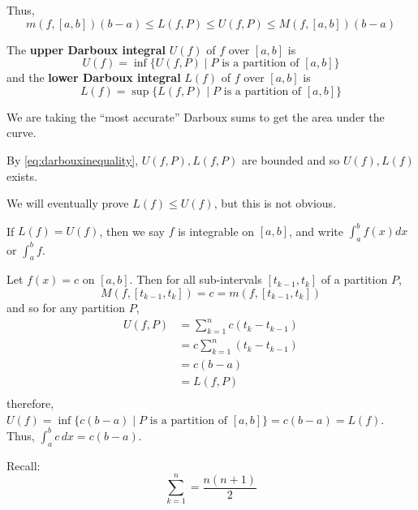 \documentclass{article}
\begin{document}
\begin{proposition}
  Thus,
  \begin{equation} \label{eq:darbouxinequality}
    m(f, [a, b])(b-a) \leq L(f, P) \leq U(f, P) \leq M(f, [a, b])(b-a)
  \end{equation}
\end{proposition}
\begin{definition}
  The \textbf{upper Darboux integral} $U(f)$ of $f$ over $[a, b]$ is \[
    U(f) = \inf \{U(f, P) \mid P \text{ is a partition of } [a, b]\}
  \]
  and the \textbf{lower Darboux integral} $L(f)$ of $f$ over $[a, b]$ is \[
    L(f) = \sup \{L(f, P) \mid P \text{ is a partition of } [a, b]\}
  \]

  We are taking the ``most accurate'' Darboux sums to get the area under the curve.
\end{definition}
\begin{lemma}
  By \eqref{eq:darbouxinequality}, $U(f, P), L(f, P)$ are bounded and so $U(f), L(f)$ exists.
\end{lemma}
\begin{remark}
  We will eventually prove $L(f) \leq U(f)$, but this is not obvious.
\end{remark}
\begin{definition}
  If $L(f) = U(f)$, then we say $f$ is integrable on $[a, b]$, and write $\int_a^b f(x) dx$ or $\int_a^b f$.
\end{definition}
\begin{example}
  Let $f(x) = c$ on $[a, b]$. Then for all sub-intervals $[t_{k-1}, t_k]$ of a partition $P$, \[
    M(f, [t_{k-1}, t_k]) = c = m(f, [t_{k-1}, t_k])
  \]
  and so for any partition $P$,
  \begin{align*}
    U(f, P) &= \sum_{k=1}^n c(t_k - t_{k-1})\\
    &=c \sum_{k=1}^n(t_k - t_{k-1})\\
    &=c (b-a)\\
    &= L(f, P) \tag{By similar argument}\\
  \end{align*}
  therefore, $U(f) = \inf\{c(b-a) \mid P \text{ is a partition of } [a, b]\} = c(b-a) = L(f)$. Thus, $\int_{a}^b c \, dx = c(b-a)$.
\end{example}
\begin{remark}
  Recall:
  \[
    \sum_{k=1}^n = \frac{n(n+1)}{2}
  \]
\end{remark}
\end{document}
